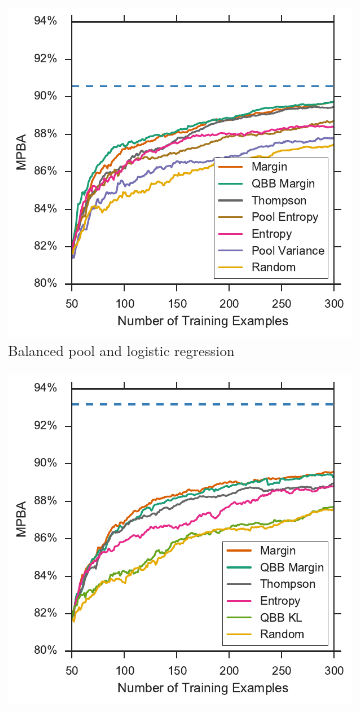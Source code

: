 \begin{figure}[p]
	\centering
	\begin{subfigure}{.5\textwidth}
		\centering
		\includegraphics[width=\textwidth]{figures/5_active/sdss_bl_ind_upper}
		\caption{Balanced pool and logistic regression}
		\label{fig:sdss_bl_ind_upper}
	\end{subfigure}%
	\begin{subfigure}{.5\textwidth}
		\centering
		\includegraphics[width=\linewidth]{figures/5_active/sdss_br_ind_upper}

\end{subfigure}
\end{figure}
